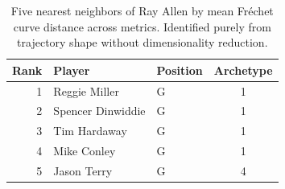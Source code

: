 \begin{table}[htbp]
  \centering\small
  \begin{tabular}{rllc}
    \toprule
    Rank & Player & Position & Archetype \\
    \midrule
    1 & Reggie Miller & G & 1 \\
    2 & Spencer Dinwiddie & G & 1 \\
    3 & Tim Hardaway & G & 1 \\
    4 & Mike Conley & G & 1 \\
    5 & Jason Terry & G & 4 \\
    \bottomrule
  \end{tabular}
  \caption{Five nearest neighbors of Ray Allen by mean Fr\'{e}chet curve distance across metrics. Identified purely from trajectory shape without dimensionality reduction.}
  \label{tab:Ray_Allen_frechet_curve_neighbors}
\end{table}

